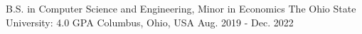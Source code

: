

\begin{cventries}

  \cventry
    {B.S. in Computer Science and Engineering, Minor in Economics} %
    {The Ohio State University: 4.0 GPA} %
    {Columbus, Ohio, USA} %
    {Aug. 2019 - Dec. 2022} %
    {
      \begin{cvitems} %
        \item {}
      \end{cvitems}
    }

\end{cventries}
